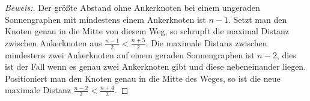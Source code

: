 \begin{proof}[Beweis:]
Der größte Abstand ohne Ankerknoten bei einem ungeraden Sonnengraphen mit mindestens einem Ankerknoten ist $n-1$. Setzt man den Knoten genau in die Mitte von diesem Weg, so schrupft die maximal Distanz zwischen Ankerknoten aus $\frac{n-1}{2}<\frac{n+5}{2}$.\newline\newline
Die maximale Distanz zwischen mindestens zwei Ankerknoten auf einem geraden Sonnengraphen ist $n-2$, dies ist der Fall wenn es genau zwei Ankerknoten gibt und diese nebeneinander liegen. Positioniert man den Knoten genau in die Mitte des Weges, so ist die neue maximale Distanz $\frac{n-2}{2}<\frac{n+4}{2}$.
\end{proof}


